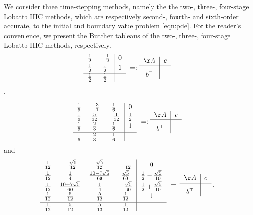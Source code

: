 We consider three time-stepping methods,
namely the the two-, three-, four-stage Lobatto IIIC methods, which are respectively second-, fourth- and sixth-order accurate, to the
initial and boundary value problem \eqref{eqn:pde}.
For the reader's convenience, we present the Butcher tableaus of the
two-, three-, four-stage Lobatto IIIC methods, respectively,
%
\begin{equation}
\label{2-stage}
\begin{tabular}{cc|c}
 $\frac12$ &  $-\frac12$  & $0$\\[2pt]
 $\frac12$  & $\frac12 $& $1$ \\[2pt]
\hline
 $\frac12 $  & $\frac12$  & $\; $ \\
\end{tabular}
\ =:
\begin{tabular}{c|c}
 $\AA$ & $c$ \\[1pt]
\hline
 $b^\top$  & $\vphantom{\sum^{\sum^\sum}} $ \\
\end{tabular}
\end{equation},

\begin{equation}
\label{3-stage}
\begin{tabular}{ccc|c}
 $\frac16$ &  $-\frac31$
 & $\frac16$ & $0$ \\[2pt]
 $\frac16$  & $\frac5{12}$
 & $-\frac1{12}$ & $\frac12$ \\[2pt]
 $\frac16$  & $\frac23$
 & $\frac16$ & $1$ \\*[3pt]
\hline
 $\frac16 $  & $\frac23$ & $ \frac16$   & $\; $ \\
\end{tabular}
\ =:
\begin{tabular}{c|c}
 $\AA$ & $c$ \\[1pt]
\hline
 $b^\top$  & $\vphantom{\sum^{\sum^\sum}} $ \\
\end{tabular}
\end{equation}
%
and
%
\begin{equation}
\label{4-stage}
\begin{tabular}{cccc|c}
 $\frac1{12}$ &  $-\frac {\sqrt{5}}{12}$
 & $\frac {\sqrt{5}}{12}$ & $-\frac1{12}$ & $0$ \\*[2pt]
 $\frac1{12}$  & $\frac14 $ & $\frac{10-7\sqrt{5}}{60}$
 & $\frac{\sqrt{5}}{60}$
 & $\frac12-\frac{\sqrt{5}}{10}$\\*[2pt]
 $\frac1{12}$  & $\frac{10+7\sqrt{5}}{60}$
 &$\frac14$& $-\frac{\sqrt{5}}{60}$
 &  $\frac12+\frac{\sqrt{5}}{10}$ \\*[2pt]
  $\frac1{12}$ & $\frac5{12}$ &  $\frac5{12}$
 & $\frac1{12}$ & $1$ \\[3pt]
\hline
   $\frac1{12}$ & $\frac5{12}$ &  $\frac5{12}$
 & $\frac1{12}$ &  \\
\end{tabular}
\ =:
\begin{tabular}{c|c}
 $\AA$ & $c$ \\[1pt]
\hline
 $b^\top$  & $\vphantom{\sum^{\sum^\sum}} $ \\
\end{tabular}
\,.
\end{equation}
%


